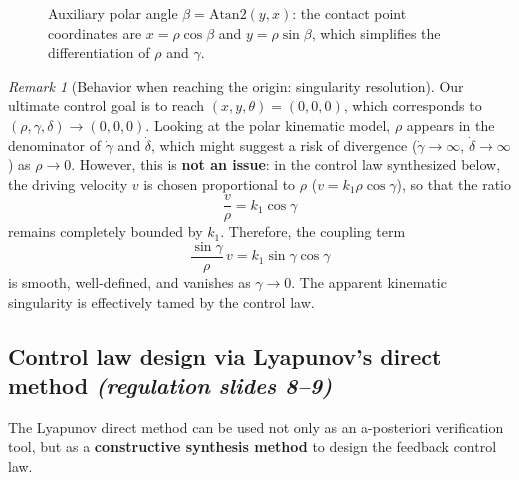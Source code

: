 \documentclass[11pt,a4paper]{article}
\theoremstyle{plain}
\theoremstyle{definition}
\theoremstyle{remark}
\newtheorem{remark}[theorem]{Remark}
\begin{document}
\begin{figure}[ht]
\centering
{}
\caption{Auxiliary polar angle $\beta=\mathrm{Atan2}(y,x)$: the contact point coordinates are $x=\rho\cos\beta$ and $y=\rho\sin\beta$, which simplifies the differentiation of $\rho$ and $\gamma$.}
\label{fig:polarbeta}
\end{figure}

\begin{remark}[Behavior when reaching the origin: singularity resolution]
Our ultimate control goal is to reach $(x,y,\theta)=(0,0,0)$, which corresponds to $(\rho,\gamma,\delta)\to(0,0,0)$.
Looking at the polar kinematic model, $\rho$ appears in the denominator of $\dot\gamma$ and $\dot\delta$, which might suggest a risk of divergence ($\dot\gamma\to\infty$, $\dot\delta\to\infty$) as $\rho\to0$.
However, this is \textbf{not an issue}: in the control law synthesized below, the driving velocity $v$ is chosen proportional to $\rho$ ($v = k_1\rho\cos\gamma$), so that the ratio
\[
\frac{v}{\rho} = k_1\cos\gamma
\]
remains completely bounded by $k_1$. Therefore, the coupling term
\[
\frac{\sin\gamma}{\rho}\,v = k_1\sin\gamma\cos\gamma
\]
is smooth, well-defined, and vanishes as $\gamma\to0$. The apparent kinematic singularity is effectively tamed by the control law.
\end{remark}

\subsection{Control law design via Lyapunov's direct method \emph{(regulation slides 8--9)}}

The Lyapunov direct method can be used not only as an a-posteriori verification tool, but as a \textbf{constructive synthesis method} to design the feedback control law.
\end{document}
